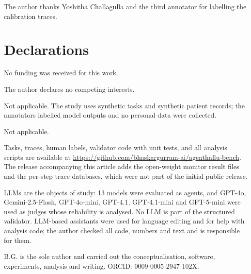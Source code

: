 \documentclass[pdflatex,sn-mathphys-num,Numbered]{sn-jnl}
\newif\ifanon
\begin{document}
\backmatter

\ifanon
Omitted for anonymous review.
\else
The author thanks Yoshitha Challagulla and the third annotator for labelling the calibration traces.
\fi

\section*{Declarations}

 No funding was received for this work.

 The author declares no competing interests.

 Not applicable. The study uses synthetic tasks and synthetic patient records; the annotators labelled model outputs and no personal data were collected.

 Not applicable.

\ifanon
Tasks, traces, human labels, validator code with unit tests, and all analysis scripts are in a public repository whose link is withheld for anonymous review and will be added on acceptance. The release includes the open-weight monitor result files and the per-step trace databases.
\else
Tasks, traces, human labels, validator code with unit tests, and all analysis scripts are available at \url{https://github.com/bhaskargurram-ai/agenthallu-bench}. The release accompanying this article adds the open-weight monitor result files and the per-step trace databases, which were not part of the initial public release.
\fi

 LLMs are the objects of study: 13 models were evaluated as agents, and GPT-4o, Gemini-2.5-Flash, GPT-4o-mini, GPT-4.1, GPT-4.1-mini and GPT-5-mini were used as judges whose reliability is analysed. No LLM is part of the structured validator. LLM-based assistants were used for language editing and for help with analysis code; the author checked all code, numbers and text and is responsible for them.

\ifanon
Omitted for anonymous review.
\else
B.G. is the sole author and carried out the conceptualisation, software, experiments, analysis and writing. ORCID: 0009-0005-2947-102X.
\fi


\end{document}
